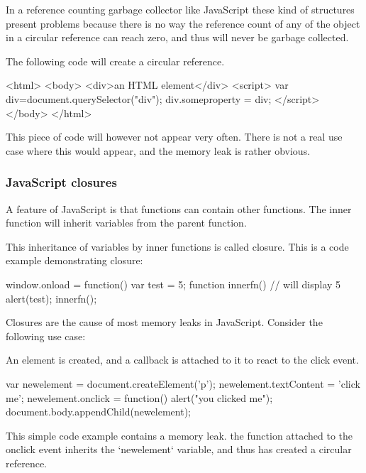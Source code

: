 In a reference counting garbage collector like JavaScript these kind of
structures present problems because there is no way the reference count of any
of the object in a circular reference can reach zero, and thus will never be
garbage collected.

The following code will create a circular reference.
\begin{pyglist}[language=html,numbers=left,numbersep=5pt,fontsize=\small]
<html>
  <body>
    <div>an HTML element</div>
    <script>
      var div=document.querySelector("div");
      div.someproperty = div;
    </script>
  </body>
</html>
\end{pyglist}

This piece of code will however not appear very often. There is not a real use
case where this would appear, and the memory leak is rather obvious.

\subsubsection{JavaScript closures}
A feature of JavaScript is that functions can contain other functions. The inner
function will inherit variables from the parent function.

This inheritance of variables by inner functions is called closure.
This is a code example demonstrating closure:
\begin{pyglist}[language=javascript,numbers=left,numbersep=5pt,fontsize=\small]
window.onload = function() {
  var test = 5;
  function innerfn() {
    // will display 5
    alert(test);
  }
  innerfn();
}
\end{pyglist}

Closures are the cause of most memory leaks in JavaScript.
Consider the following use case:

An element is created, and a callback is attached to it to react to the click event.
\begin{pyglist}[language=javascript,numbers=left,numbersep=5pt,fontsize=\small]
var newelement = document.createElement('p');
newelement.textContent = 'click me';
newelement.onclick = function() {
  alert("you clicked me");
}
document.body.appendChild(newelement);
\end{pyglist}
This simple code example contains a memory leak. the function attached to the
onclick event inherits the `newelement` variable, and thus has created a
circular reference.


